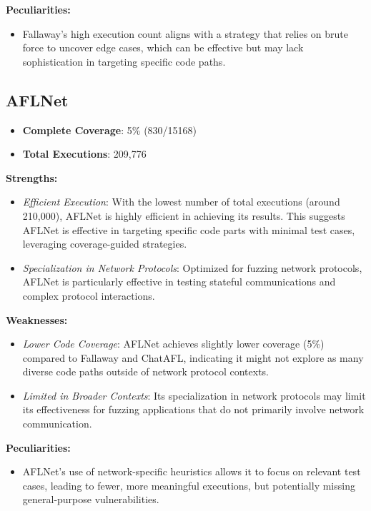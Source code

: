 \textbf{Peculiarities:}
\begin{itemize}
    \item Fallaway’s high execution count aligns with a strategy that relies on brute force to uncover edge cases, which can be effective but may lack sophistication in targeting specific code paths.
\end{itemize}

\subsection{AFLNet}

\begin{itemize}
    \item \textbf{Complete Coverage}: 5\% (830/15168)
    \item \textbf{Total Executions}: 209,776
\end{itemize}

\textbf{Strengths:}
\begin{itemize}
    \item \textit{Efficient Execution}: With the lowest number of total executions (around 210,000), AFLNet is highly efficient in achieving its results. This suggests AFLNet is effective in targeting specific code parts with minimal test cases, leveraging coverage-guided strategies.
    \item \textit{Specialization in Network Protocols}: Optimized for fuzzing network protocols, AFLNet is particularly effective in testing stateful communications and complex protocol interactions.
\end{itemize}

\textbf{Weaknesses:}
\begin{itemize}
    \item \textit{Lower Code Coverage}: AFLNet achieves slightly lower coverage (5\%) compared to Fallaway and ChatAFL, indicating it might not explore as many diverse code paths outside of network protocol contexts.
    \item \textit{Limited in Broader Contexts}: Its specialization in network protocols may limit its effectiveness for fuzzing applications that do not primarily involve network communication.
\end{itemize}

\textbf{Peculiarities:}
\begin{itemize}
    \item AFLNet's use of network-specific heuristics allows it to focus on relevant test cases, leading to fewer, more meaningful executions, but potentially missing general-purpose vulnerabilities.
\end{itemize}
\phantom{}\\
